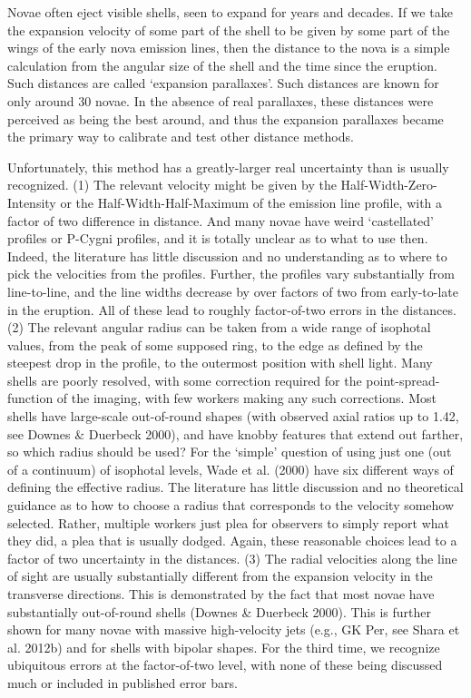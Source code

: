 \documentclass[a4paper,fleqn,usenatbib]{mnras}
\begin{document}
Novae often eject visible shells, seen to expand for years and decades.  If we take the expansion velocity of some part of the shell to be given by some part of the wings of the early nova emission lines, then the distance to the nova is a simple calculation from the angular size of the shell and the time since the eruption.  Such distances are called `expansion parallaxes'.  Such distances are known for only around 30 novae.  In the absence of real parallaxes, these distances were perceived as being the best around, and thus the expansion parallaxes became the primary way to calibrate and test other distance methods.

Unfortunately, this method has a greatly-larger real uncertainty than is usually recognized.  (1) The relevant velocity might be given by the Half-Width-Zero-Intensity or the Half-Width-Half-Maximum of the emission line profile, with a factor of two difference in distance.  And many novae have weird `castellated' profiles or P-Cygni profiles, and it is totally unclear as to what to use then.  Indeed, the literature has little discussion and no understanding as to where to pick the velocities from the profiles.  Further, the profiles vary substantially from line-to-line, and the line widths decrease by over factors of two from early-to-late in the eruption.  All of these lead to roughly factor-of-two errors in the distances.  (2) The relevant angular radius can be taken from a wide range of isophotal values, from the peak of some supposed ring, to the edge as defined by the steepest drop in the profile, to the outermost position with shell light.  Many shells are poorly resolved, with some correction required for the point-spread-function of the imaging, with few workers making any such corrections.  Most shells have large-scale out-of-round shapes (with observed axial ratios up to 1.42, see Downes \& Duerbeck 2000), and have knobby features that extend out farther, so which radius should be used?  For the `simple' question of using just one (out of a continuum) of isophotal levels, Wade et al. (2000) have six different ways of defining the effective radius.  The literature has little discussion and no theoretical guidance as to how to choose a radius that corresponds to the velocity somehow selected.  Rather, multiple workers just plea for observers to simply report what they did, a plea that is usually dodged.  Again, these reasonable choices lead to a factor of two uncertainty in the distances.  (3) The radial velocities along the line of sight are usually substantially different from the expansion velocity in the transverse directions.  This is demonstrated by the fact that most novae have substantially out-of-round shells (Downes \& Duerbeck 2000).  This is further shown for many novae with massive high-velocity jets (e.g., GK Per, see Shara et al. 2012b) and for shells with bipolar shapes.  For the third time, we recognize ubiquitous errors at the factor-of-two level, with none of these being discussed much or included in published error bars.
\end{document}
